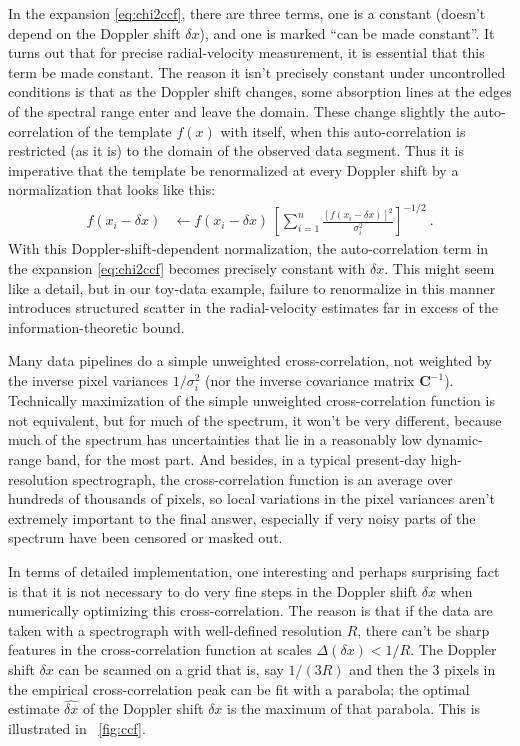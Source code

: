 \documentclass[modern]{aastex631}
\newcommand{\lao}[1]{\boldsymbol{#1}}
\newcommand{\vC}{\lao{C}}
\newcommand{\figref}[1]{\figurename~\ref{#1}}
\begin{document}
In the expansion \eqref{eq:chi2ccf}, there are three terms, one is a constant (doesn't depend on the Doppler shift $\delta x$), and one is marked ``can be made constant''.
It turns out that for precise radial-velocity measurement, it is essential that this term be made constant.
The reason it isn't precisely constant under uncontrolled conditions is that as the Doppler shift changes, some absorption lines at the edges of the spectral range enter and leave the domain.
These change slightly the auto-correlation of the template $f(x)$ with itself, when this auto-correlation is restricted (as it is) to the domain of the observed data segment.
Thus it is imperative that the template be renormalized at every Doppler shift by a normalization that looks like this:
\begin{align}
    f(x_i-\delta x) &\leftarrow f(x_i-\delta x)\,\left[\sum_{i=1}^n \frac{[f(x_i-\delta x)]^2}{\sigma_i^2}\right]^{-1/2} ~.
\end{align}
With this Doppler-shift-dependent normalization, the auto-correlation term in the expansion \eqref{eq:chi2ccf} becomes precisely constant with $\delta x$.
This might seem like a detail, but in our toy-data example, failure to renormalize in this manner introduces structured scatter in the radial-velocity estimates far in excess of the information-theoretic bound.

Many data pipelines do a simple unweighted cross-correlation, not weighted by the inverse pixel variances $1/\sigma_i^2$ (nor the inverse covariance matrix $\vC^{-1}$).
Technically maximization of the simple unweighted cross-correlation function is not equivalent, but for much of the spectrum, it won't be very different, because much of the spectrum has uncertainties that lie in a reasonably low dynamic-range band, for the most part.
And besides, in a typical present-day high-resolution spectrograph, the cross-correlation function is an average over hundreds of thousands of pixels, so local variations in the pixel variances aren't extremely important to the final answer, especially if very noisy parts of the spectrum have been censored or masked out.

In terms of detailed implementation, one interesting and perhaps surprising fact is that it is not necessary to do very fine steps in the Doppler shift $\delta x$ when numerically optimizing this cross-correlation.
The reason is that if the data are taken with a spectrograph with well-defined resolution $R$, there can't be sharp features in the cross-correlation function at scales $\Delta(\delta x)<1/R$.
The Doppler shift $\delta x$ can be scanned on a grid that is, say $1/(3R)$ and then the 3 pixels in the empirical cross-correlation peak can be fit with a parabola; the optimal estimate $\widehat{\delta x}$ of the Doppler shift $\delta x$ is the maximum of that parabola.
This is illustrated in \figref{fig:ccf}.
\end{document}
